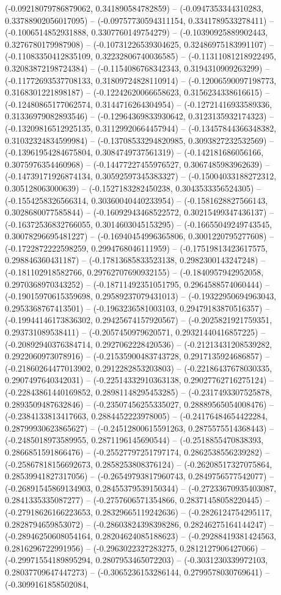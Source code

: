 (-0.09218079786879062, 0.341890584782859) -- (-0.0947353344310283, 0.33788902056017095) -- (-0.09757730594311154, 0.3341789533278411) -- (-0.1006514852931888, 0.3307760149754279) -- (-0.10390925889902443, 0.3276780179987908) -- (-0.10731226539304625, 0.32486975183991107) -- (-0.11083350412835109, 0.32232806740036585) -- (-0.11311081218922495, 0.32083872198724384) -- (-0.1154086768342343, 0.3194310909263299) -- (-0.11772693537708133, 0.31809724828110914) -- (-0.12006590097198773, 0.3168301221898187) -- (-0.12242620066658623, 0.3156234338616615) -- (-0.12480865177062574, 0.3144716264304954) -- (-0.12721416933589336, 0.31336979082893546) -- (-0.12964369833930642, 0.3123135932174323) -- (-0.13209816512925135, 0.31129920664457944) -- (-0.13457844366348382, 0.31032324834599984) -- (-0.13708533294820985, 0.3093827232532569) -- (-0.13961954284675804, 0.3084749737561319) -- (-0.142181686056166, 0.3075976354460968) -- (-0.14477227455976527, 0.3067485983962639) -- (-0.14739171926874134, 0.30592597345383327) -- (-0.15004033188272312, 0.305128063000639) -- (-0.1527183282450238, 0.3043533356524305) -- (-0.1554258326566314, 0.30360040440233954) -- (-0.1581628827566143, 0.3028680077585844) -- (-0.16092943468522572, 0.30215499347436137) -- (-0.16372536832766055, 0.3014603045153295) -- (-0.16655049249743545, 0.30078296695481227) -- (-0.16940454996365806, 0.3001220795277608) -- (-0.1722872222598259, 0.2994768046111959) -- (-0.17519813423617575, 0.298846360431187) -- (-0.17813685833523138, 0.2982300143247248) -- (-0.181102918582766, 0.29762707690932155) -- (-0.1840957942952058, 0.2970368970343252) -- (-0.18711492351051795, 0.2964588574060444) -- (-0.19015970615359698, 0.29589237079431013) -- (-0.19322950694963043, 0.2953368767413501) -- (-0.1963236581003103, 0.29479183870516357) -- (-0.19944146173836302, 0.29425674157920567) -- (-0.2025821921759351, 0.293731089538411) -- (-0.2057450979620571, 0.29321440416857225) -- (-0.20892940376384714, 0.2927062228420536) -- (-0.21213431208539282, 0.2922060973078916) -- (-0.21535900483743728, 0.2917135924686857) -- (-0.21860264477013902, 0.2912282853203803) -- (-0.22186437678030335, 0.2907497640342031) -- (-0.22514332910363138, 0.29027762716275124) -- (-0.22843861440169852, 0.28981148295453285) -- (-0.2317493307525878, 0.2893509487632846) -- (-0.23507456255335027, 0.28889565054008476) -- (-0.2384133813417663, 0.2884452223978005) -- (-0.24176484654422284, 0.28799930623865627) -- (-0.24512800615591263, 0.2875575514368443) -- (-0.2485018973589955, 0.2871196145690544) -- (-0.2518855470838393, 0.2866851591866476) -- (-0.25527797251797174, 0.2862538556239282) -- (-0.25867818156692673, 0.2858253808376124) -- (-0.26208517327075864, 0.28539941827317056) -- (-0.26549793817960743, 0.2849756577542077) -- (-0.26891545869134903, 0.28455379539150344) -- (-0.27233670935403087, 0.2841335335087277) -- (-0.2757606571354866, 0.28371458058220445) -- (-0.27918626166223653, 0.28329665119242636) -- (-0.2826124754295117, 0.2828794659853072) -- (-0.28603824398398286, 0.28246275164144247) -- (-0.28946250608054164, 0.28204624085188623) -- (-0.29288419381424563, 0.2816296722991956) -- (-0.2963022327283275, 0.2812127906427066) -- (-0.29971554189895294, 0.2807953465072203) -- (-0.3031230339972103, 0.28037709647447273) -- (-0.3065236153286144, 0.2799578030769641) -- (-0.3099161858502084, 